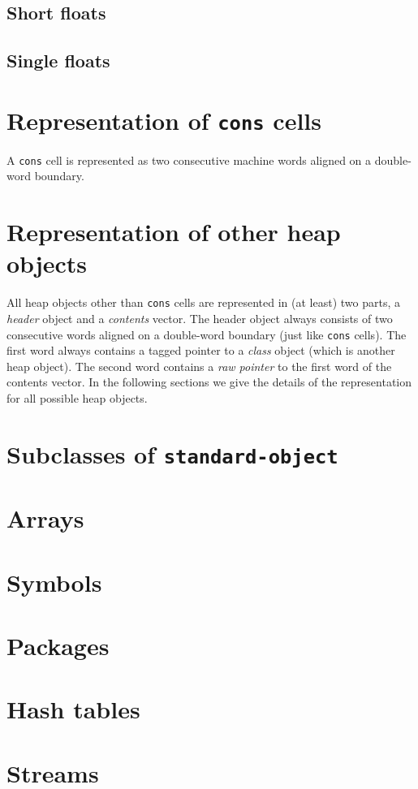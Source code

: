 \subsection{Short floats}

\subsection{Single floats}

\section{Representation of \texttt{cons} cells}

A \texttt{cons} cell is represented as two consecutive machine
words aligned on a double-word boundary.

\section{Representation of other heap objects}

All heap objects other than \texttt{cons} cells are represented in (at
least) two parts, a \emph{header} object and a \emph{contents} vector.
The header object always consists of two consecutive words aligned on
a double-word boundary (just like \texttt{cons} cells).  The first
word always contains a tagged pointer to a \emph{class} object (which
is another heap object).  The second word contains a \emph{raw
  pointer} to the first word of the contents vector.  In the following
sections we give the details of the representation for all possible
heap objects.

\section{Subclasses of \texttt{standard-object}}

\section{Arrays}

\section{Symbols}

\section{Packages}

\section{Hash tables}

\section{Streams}



